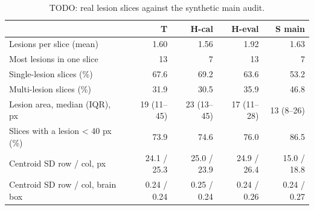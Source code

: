 \begin{table}
\centering
\small
\begin{tabular}{lrrrr}
\toprule
 & T & H-cal & H-eval & S main \\
\midrule
Lesions per slice (mean) & 1.60 & 1.56 & 1.92 & 1.63 \\
Most lesions in one slice & 13 & 7 & 13 & 7 \\
Single-lesion slices (\%) & 67.6 & 69.2 & 63.6 & 53.2 \\
Multi-lesion slices (\%) & 31.9 & 30.5 & 35.9 & 46.8 \\
Lesion area, median (IQR), px & 19 (11--45) & 23 (13--45) & 17 (11--28) & 13 (8--26) \\
Slices with a lesion < 40 px (\%) & 73.9 & 74.6 & 76.0 & 86.5 \\
Centroid SD row / col, px & 24.1 / 25.3 & 25.0 / 23.9 & 24.9 / 26.4 & 15.0 / 18.8 \\
Centroid SD row / col, brain box & 0.24 / 0.24 & 0.25 / 0.24 & 0.24 / 0.26 & 0.24 / 0.27 \\
\bottomrule
\end{tabular}
\caption{TODO: real lesion slices against the synthetic main audit.}
\label{tab:description}
\end{table}
